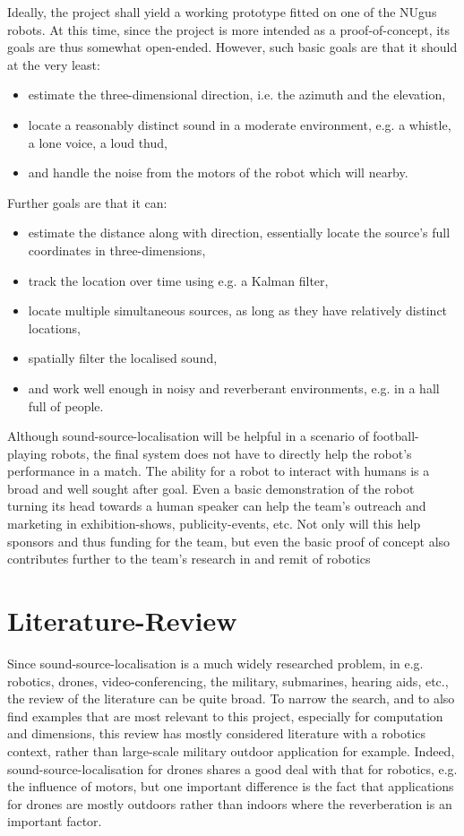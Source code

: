 \documentclass[notitlepage]{report}
\begin{document}
Ideally, the project shall yield a working prototype fitted on one of the NUgus robots. At this time, since the project is more intended as a proof-of-concept, its goals are thus somewhat open-ended. However, such basic goals are that it should at the very least:
\begin{itemize}
	\item estimate the three-dimensional direction, i.e. the azimuth and the elevation,
	\item locate a reasonably distinct sound in a moderate environment, e.g. a whistle, a lone voice, a loud thud,
	\item and handle the noise from the motors of the robot which will nearby.
\end{itemize}
Further goals are that it can:
\begin{itemize}
	\item estimate the distance along with direction, essentially locate the source's full coordinates in three-dimensions,
	\item track the location over time using e.g. a Kalman filter,
	\item locate multiple simultaneous sources, as long as they have relatively distinct locations,
	\item spatially filter the localised sound,
	\item and work well enough in noisy and reverberant environments, e.g. in a hall full of people.
\end{itemize}


Although sound-source-localisation will be helpful in a scenario of football-playing robots, the final system does not have to directly help the robot's performance in a match. The ability for a robot to interact with humans is a broad and well sought after goal. Even a basic demonstration of the robot turning its head towards a human speaker can help the team's outreach and marketing in exhibition-shows, publicity-events, etc. Not only will this help sponsors and thus funding for the team, but even the basic proof of concept also contributes further to the team's research in and remit of robotics 

\chapter{Literature-Review}

Since sound-source-localisation is a much widely researched problem, in e.g. robotics, drones, video-conferencing, the military, submarines, hearing aids, etc., the review of the literature can be quite broad. To narrow the search, and to also find examples that are most relevant to this project, especially for computation and dimensions, this review has mostly considered literature with a robotics context, rather than large-scale military outdoor application for example. Indeed, sound-source-localisation for drones shares a good deal with that for robotics, e.g. the influence of motors, but one important difference is the fact that applications for drones are mostly outdoors rather than indoors where the reverberation is an important factor.
\end{document}

